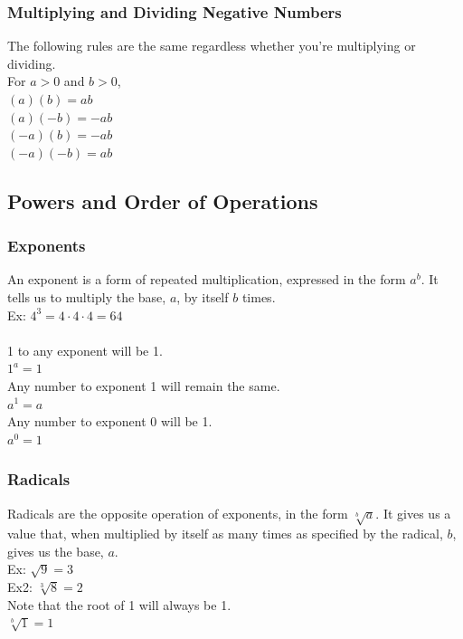 \documentclass[11pt, fleqn]{article}
\begin{document}
\subsubsection{Multiplying and Dividing Negative Numbers}
The following rules are the same regardless whether you're multiplying or dividing.\\
For $a > 0$ and $b > 0$,\\
$(a)(b)=ab$\\
$(a)(-b)=-ab$\\
$(-a)(b)=-ab$\\
$(-a)(-b)=ab$












\subsection{Powers and Order of Operations}

\subsubsection{Exponents}
An exponent is a form of repeated multiplication, expressed in the form $a^b$. It tells us to multiply the base, $a$, by itself $b$ times.\\
Ex: $4^3=4\cdot 4\cdot 4=64$\\
\\
1 to any exponent will be 1.\\
$1^a=1$\\
Any number to exponent 1 will remain the same.\\
$a^1=a$\\
Any number to exponent 0 will be 1.\\
$a^0=1$

\subsubsection{Radicals}
Radicals are the opposite operation of exponents, in the form $\sqrt[b]{a}$. It gives us a value that, when multiplied by itself as many times as specified by the radical, $b$, gives us the base, $a$.\\
Ex: $\sqrt{9}=3$\\
Ex2: $\sqrt[3]{8}=2$\\
Note that the root of 1 will always be 1.\\
$\sqrt[b]{1}=1$
\end{document}
